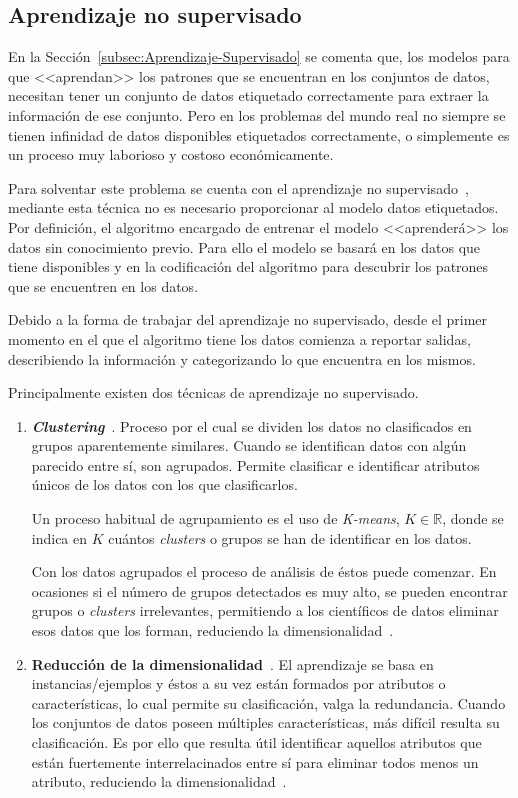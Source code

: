 \subsection{Aprendizaje no supervisado}\label{subsec:Aprendizaje-No-Supervisado}
En la Sección~\ref{subsec:Aprendizaje-Supervisado} se comenta que, los modelos para que <<aprendan>> los patrones que se encuentran en los conjuntos de datos, necesitan tener un conjunto de datos etiquetado correctamente para extraer la información de ese conjunto. Pero en los problemas del mundo real no siempre se tienen infinidad de datos disponibles etiquetados correctamente, o simplemente es un proceso muy laborioso y costoso económicamente.

Para solventar este problema se cuenta con el aprendizaje no supervisado~\cite{bengio2012unsupervised}, mediante esta técnica no es necesario proporcionar al modelo datos etiquetados. Por definición, el algoritmo encargado de entrenar el modelo  <<aprenderá>> los datos sin conocimiento previo. Para ello el modelo se basará en los datos que tiene disponibles y en la codificación del algoritmo para descubrir los patrones que se encuentren en los datos.

Debido a la forma de trabajar del aprendizaje no supervisado, desde el primer momento en el que el algoritmo tiene los datos comienza a reportar salidas, describiendo la información y categorizando lo que encuentra en los mismos.

Principalmente existen dos técnicas de aprendizaje no supervisado.
\begin{enumerate}
	\item \textbf{\textit{Clustering}}~\cite{unsupervised_learning_clustering}. Proceso por el cual se dividen los datos no clasificados en grupos aparentemente similares. Cuando se identifican datos con algún parecido entre sí, son agrupados. Permite clasificar e identificar atributos únicos de los datos con los que clasificarlos. 
	
	Un proceso habitual de agrupamiento es el uso de \textit{K-means}, $K\in\mathbb{R}$, donde se indica en $K$ cuántos \textit{clusters} o grupos se han de identificar en los datos.
	
	Con los datos agrupados el proceso de análisis de éstos puede comenzar. En ocasiones si el número de grupos detectados es muy alto, se pueden encontrar grupos o \textit{clusters} irrelevantes, permitiendo a los científicos de datos eliminar esos datos que los forman, reduciendo la dimensionalidad~\cite{boutsidis2014randomized}.
	
	\item \textbf{Reducción de la dimensionalidad}~\cite{li2002unsupervised}. El aprendizaje se basa en instancias/ejemplos y éstos a su vez están formados por atributos o características, lo cual permite su clasificación, valga la redundancia. Cuando los conjuntos de datos poseen múltiples características, más difícil resulta su clasificación. Es por ello que resulta útil identificar aquellos atributos que están fuertemente interrelacinados entre sí para eliminar todos menos un atributo, reduciendo la dimensionalidad~\cite{li2002unsupervised}.
\end{enumerate}

